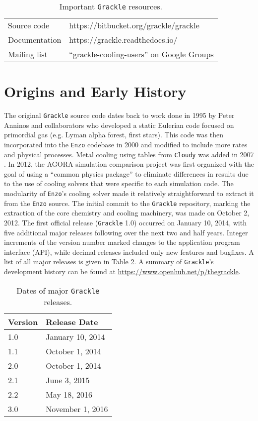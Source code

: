 \begin{table}
  \centering
  \caption{Important \texttt{Grackle} resources.}
  \label{tab:resources}
  \begin{tabular}{ll}
    \hline
    Source code & https://bitbucket.org/grackle/grackle\\
    Documentation & https://grackle.readthedocs.io/\\
    Mailing list & ``grackle-cooling-users'' on Google Groups\\
    \hline
  \end{tabular}
\end{table}


\section{Origins and Early History}
\label{sec:origins}

The original \texttt{Grackle} source code dates back to work done in
1995 by Peter Anninos and collaborators
\citep{1997NewA....2..209A} who developed a static Eulerian code
focused on primordial gas (e.g. Lyman alpha forest, first stars).
This code was then incorporated into the \texttt{Enzo} codebase in 2000
and modified to include more rates and physical processes.  Metal
cooling using tables from \texttt{Cloudy} was added in 2007
\citep{2008MNRAS.385.1443S}.  In 2012, the AGORA simulation comparison
project \citep{2014ApJS..210...14K} was first organized with the goal
of using a ``common physics package'' to eliminate differences in
results due to the use of cooling solvers that were specific to each
simulation code.  The modularity of \texttt{Enzo}'s cooling solver made
it relatively straightforward to extract it from the \texttt{Enzo}
source.  The initial commit to the \texttt{Grackle} repository,
marking the extraction of the core chemistry and cooling machinery,
was made on October 2, 2012.  The first official release
(\texttt{Grackle} 1.0) occurred on January 10, 2014, with five
additional major releases following over the next two and half years.
Integer increments of the version number marked changes to the
application program interface (API), while decimal releases included
only new features and bugfixes.  A list of all major releases is given
in Table \ref{tab:releases}.  A summary of \texttt{Grackle}'s
development history can be found at
\url{https://www.openhub.net/p/thegrackle}.

\begin{table}
  \centering
  \caption{Dates of major \texttt{Grackle} releases.}
  \label{tab:releases}
  \begin{tabular}{ll}
    \hline
    Version & Release Date\\
    \hline
    1.0 & January 10, 2014\\
    1.1 & October 1, 2014\\
    2.0 & October 1, 2014\\
    2.1 & June 3, 2015\\
    2.2 & May 18, 2016\\
    3.0 & November 1, 2016\\
    \hline
  \end{tabular}
\end{table}

